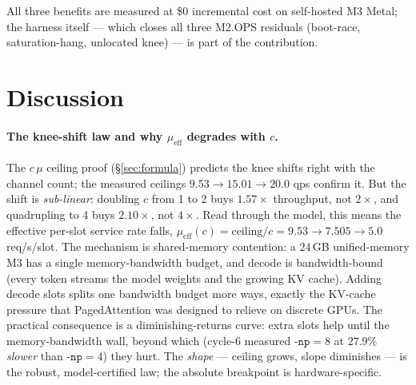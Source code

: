 \documentclass[11pt,a4paper]{article}
\begin{document}
All three benefits are measured at \$0 incremental cost on self-hosted M3 Metal;
the harness itself --- which closes all three M2.OPS residuals (boot-race,
saturation-hang, unlocated knee) --- is part of the contribution.

\section{Discussion}
\label{sec:discussion}

\paragraph{The knee-shift law and why \(\mu_{\mathrm{eff}}\) degrades with \(c\).}
The \(c\,\mu\) ceiling proof (\S\ref{sec:formula}) predicts the knee shifts
right with the channel count; the measured ceilings \(9.53\to15.01\to20.0\) qps
confirm it. But the shift is \emph{sub-linear}: doubling \(c\) from 1 to 2 buys
\(1.57\times\) throughput, not \(2\times\), and quadrupling to 4 buys
\(2.10\times\), not \(4\times\). Read through the model, this means the
effective per-slot service rate falls,
\(\mu_{\mathrm{eff}}(c)=\text{ceiling}/c = 9.53\to7.505\to5.0\) req/s/slot. The
mechanism is shared-memory contention: a 24\,GB unified-memory M3 has a single
memory-bandwidth budget, and decode is bandwidth-bound (every token streams the
model weights and the growing KV cache). Adding decode slots splits one
bandwidth budget more ways, exactly the KV-cache pressure that PagedAttention
\citep{kwon2023vllm} was designed to relieve on discrete GPUs. The practical
consequence is a diminishing-returns curve: extra slots help until the
memory-bandwidth wall, beyond which (cycle-6 measured \(\texttt{-np}{=}8\) at
\(27.9\%\) \emph{slower} than \(\texttt{-np}{=}4\)) they hurt. The \emph{shape}
--- ceiling grows, slope diminishes --- is the robust, model-certified law; the
absolute breakpoint is hardware-specific.
\end{document}

